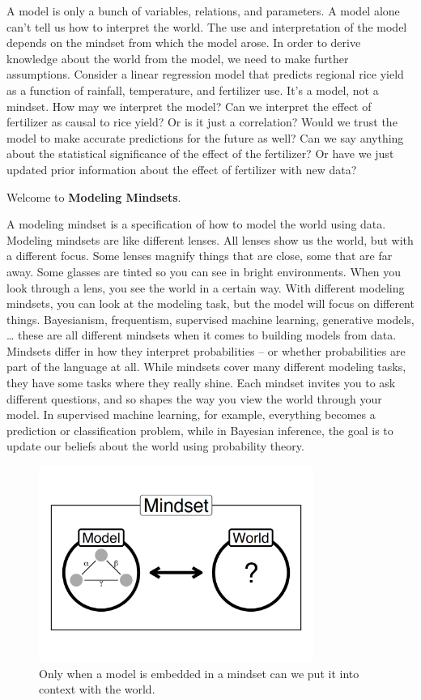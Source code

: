 \documentclass[
  10pt,
]{scrbook}
\begin{document}
A model is only a bunch of variables, relations, and parameters.
A model alone can't tell us how to interpret the world.
The use and interpretation of the model depends on the mindset from which the model arose.
In order to derive knowledge about the world from the model, we need to make further assumptions.
Consider a linear regression model that predicts regional rice yield as a function of rainfall, temperature, and fertilizer use.
It's a model, not a mindset.
How may we interpret the model?
Can we interpret the effect of fertilizer as causal to rice yield? Or is it just a correlation?
Would we trust the model to make accurate predictions for the future as well?
Can we say anything about the statistical significance of the effect of the fertilizer?
Or have we just updated prior information about the effect of fertilizer with new data?

Welcome to \textbf{Modeling Mindsets}.

A modeling mindset is a specification of how to model the world using data.
Modeling mindsets are like different lenses.
All lenses show us the world, but with a different focus.
Some lenses magnify things that are close, some that are far away.
Some glasses are tinted so you can see in bright environments.
When you look through a lens, you see the world in a certain way.
With different modeling mindsets, you can look at the modeling task, but the model will focus on different things.
Bayesianism, frequentism, supervised machine learning, generative models, \ldots{} these are all different mindsets when it comes to building models from data.
Mindsets differ in how they interpret probabilities -- or whether probabilities are part of the language at all.
While mindsets cover many different modeling tasks, they have some tasks where they really shine.
Each mindset invites you to ask different questions, and so shapes the way you view the world through your model.
In supervised machine learning, for example, everything becomes a prediction or classification problem, while in Bayesian inference, the goal is to update our beliefs about the world using probability theory.

\begin{figure}

{\centering \includegraphics[width=0.8\textwidth]{figures/mindset-1} 

}

\caption{Only when a model is embedded in a mindset can we put it into context with the world.}\label{fig:mindset}
\end{figure}
\end{document}
